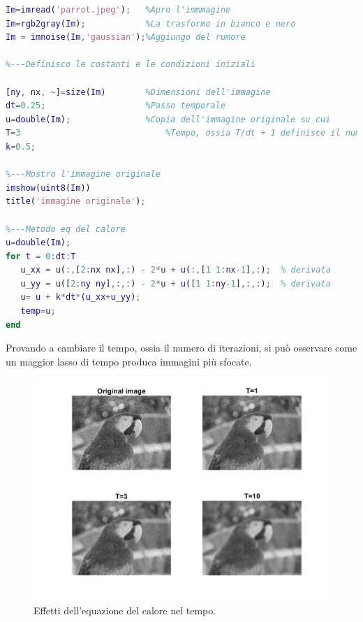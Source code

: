 \begin{lstlisting}[language=MATLAB]
Im=imread('parrot.jpeg');   %Apro l'immmagine
Im=rgb2gray(Im);            %La trasformo in bianco e nero
Im = imnoise(Im,'gaussian');%Aggiungo del rumore

%---Definisco le costanti e le condizioni iniziali

[ny, nx, ~]=size(Im)        %Dimensioni dell'immagine
dt=0.25;                    %Passo temporale
u=double(Im);               %Copia dell'immagine originale su cui                                lavorare
T=3			                    %Tempo, ossia T/dt + 1 definisce il numero                            di iterazioni da eseguire
k=0.5;

%---Mostro l'immagine originale
imshow(uint8(Im))
title('immagine originale'); 

%---Metodo eq del calore
u=double(Im);
for t = 0:dt:T
   u_xx = u(:,[2:nx nx],:) - 2*u + u(:,[1 1:nx-1],:);  % derivata                                                           seconda lungo x
   u_yy = u([2:ny ny],:,:) - 2*u + u([1 1:ny-1],:,:);  % derivata                                                            seconda lungo y
   u= u + k*dt*(u_xx+u_yy);
   temp=u;
end

\end{lstlisting}
\vspace{1em}
Provando a cambiare il tempo, ossia il numero di iterazioni, si può osservare come un maggior lasso di tempo produca immagini più sfocate.

\begin{figure}[htb] 
\centering
\includegraphics[scale=0.4]{Pictures/Risultati/eq del calore.png}
\caption{Effetti dell'equazione del calore nel tempo.}\label{fig:figura}
\end{figure}



